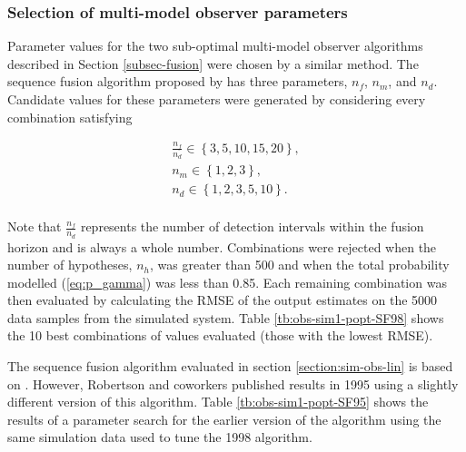 \subsubsection{Selection of multi-model observer parameters} \label{sim-obs-lin-1-MKF-tuning}

Parameter values for the two sub-optimal multi-model observer algorithms described in Section \ref{subsec-fusion} were chosen by a similar method. The sequence fusion algorithm proposed by \cite{robertson_method_1998} has three parameters, $n_f$, $n_m$, and $n_d$. Candidate values for these parameters were generated by considering every combination satisfying

\begin{equation} \label{eq:sim-sys-siso-MKF-SF-param-values}
	\begin{aligned}
		\frac{n_f}{n_d} \in \left\{3, 5, 10, 15, 20\right\},  \\
		n_m \in \left\{1, 2, 3\right\},  \\
		n_d \in \left\{1, 2, 3, 5, 10\right\}.  \\
	\end{aligned}
\end{equation}

Note that $\frac{n_f}{n_d}$ represents the number of detection intervals within the fusion horizon and is always a whole number. Combinations were rejected when the number of hypotheses, $n_h$, was greater than 500 and when the total probability modelled (\ref{eq:p_gamma}) was less than 0.85. Each remaining combination was then evaluated by calculating the RMSE of the output estimates on the 5000 data samples from the simulated system. Table \ref{tb:obs-sim1-popt-SF98} shows the 10 best combinations of values evaluated (those with the lowest RMSE).

The sequence fusion algorithm evaluated in section \ref{section:sim-obs-lin} is based on \cite{robertson_method_1998}. However, Robertson and coworkers published results in 1995 \citep{robertson_detection_1995} using a slightly different version of this algorithm. Table \ref{tb:obs-sim1-popt-SF95} shows the results of a parameter search for the earlier version of the algorithm using the same simulation data used to tune the 1998 algorithm.

